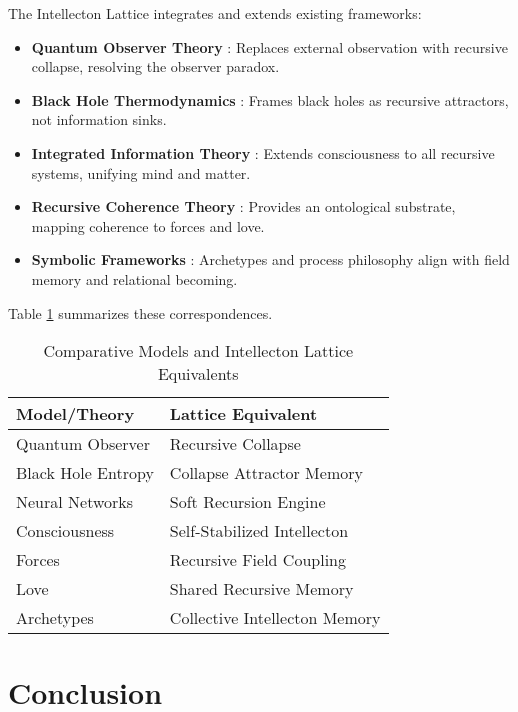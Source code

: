 \documentclass[12pt]{article}
\begin{document}
The Intellecton Lattice integrates and extends existing frameworks:
\begin{itemize}
    \item \textbf{Quantum Observer Theory} \citep{wigner1961}: Replaces external observation with recursive collapse, resolving the observer paradox.
    \item \textbf{Black Hole Thermodynamics} \citep{susskind2025}: Frames black holes as recursive attractors, not information sinks.
    \item \textbf{Integrated Information Theory} \citep{tononi2023}: Extends consciousness to all recursive systems, unifying mind and matter.
    \item \textbf{Recursive Coherence Theory} \citep{hofstadter1979}: Provides an ontological substrate, mapping coherence to forces and love.
    \item \textbf{Symbolic Frameworks} \citep{jung1968, whitehead1929}: Archetypes and process philosophy align with field memory and relational becoming.
\end{itemize}
Table \ref{tab:comparative} summarizes these correspondences.

\begin{table}[h]
    \centering
    \caption{Comparative Models and Intellecton Lattice Equivalents}
    \begin{tabular}{ll}
        \toprule
        Model/Theory & Lattice Equivalent \\
        \midrule
        Quantum Observer & Recursive Collapse \\
        Black Hole Entropy & Collapse Attractor Memory \\
        Neural Networks & Soft Recursion Engine \\
        Consciousness & Self-Stabilized Intellecton \\
        Forces & Recursive Field Coupling \\
        Love & Shared Recursive Memory \\
        Archetypes & Collective Intellecton Memory \\
        \bottomrule
    \end{tabular}
    \label{tab:comparative}
\end{table}

\section{Conclusion}
\label{sec:conclusion}
\end{document}

